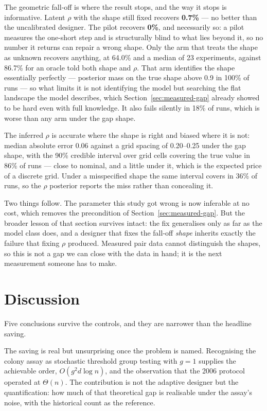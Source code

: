 \documentclass[11pt]{article}
\begin{document}
The geometric fall-off is where the result stops, and the way it stops is
informative. Latent $\rho$ with the shape still fixed recovers
\textbf{0.7\%} --- no better than the uncalibrated designer. The pilot
recovers \textbf{0\%}, and necessarily so: a pilot measures the one-short step
and is structurally blind to what lies beyond it, so no number it returns can
repair a wrong shape. Only the arm that treats the shape as unknown recovers
anything, at 64.0\% and a median of 23 experiments, against 86.7\% for an
oracle told both shape and $\rho$. That arm identifies the shape essentially
perfectly --- posterior mass on the true shape above 0.9 in 100\% of runs ---
so what limits it is not identifying the model but searching the flat
landscape the model describes, which Section~\ref{sec:measured-gap} already
showed to be hard even with full knowledge. It also fails silently in 18\% of
runs, which is worse than any arm under the gap shape.

The inferred $\rho$ is accurate where the shape is right and biased where it
is not: median absolute error 0.06 against a grid spacing of 0.20--0.25 under
the gap shape, with the 90\% credible interval over grid cells covering the
true value in 86\% of runs --- close to nominal, and a little under it, which
is the expected price of a discrete grid. Under a misspecified shape the same
interval covers in 36\% of runs, so the $\rho$ posterior reports the miss
rather than concealing it.

Two things follow. The parameter this study got wrong is now inferable at no
cost, which removes the precondition of Section~\ref{sec:measured-gap}. But
the broader lesson of that section survives intact: the fix generalises only
as far as the model class does, and a designer that fixes the fall-off
\emph{shape} inherits exactly the failure that fixing $\rho$ produced.
Measured pair data cannot distinguish the shapes, so this is not a gap we can
close with the data in hand; it is the next measurement someone has to make.

\section{Discussion}

Five conclusions survive the controls, and they are narrower than the headline
saving.

The saving is real but unsurprising once the problem is named. Recognising the
colony assay as stochastic threshold group testing with $g = 1$ supplies the
achievable order, $O(g^2 d\log n)$, and the observation that the 2006 protocol
operated at $\Theta(n)$. The contribution is not the adaptive designer but the
quantification: how much of that theoretical gap is realisable under the assay's
noise, with the historical count as the reference.
\end{document}
